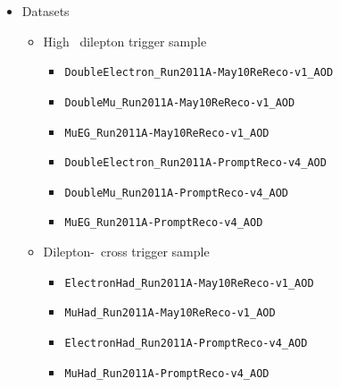 \begin{itemize}
   \item Datasets
   \begin{itemize}
      \item High \pt\ dilepton trigger sample
      \begin{itemize}
         \item \verb=DoubleElectron_Run2011A-May10ReReco-v1_AOD=
         \item \verb=DoubleMu_Run2011A-May10ReReco-v1_AOD=
         \item \verb=MuEG_Run2011A-May10ReReco-v1_AOD=
         \item \verb=DoubleElectron_Run2011A-PromptReco-v4_AOD=
         \item \verb=DoubleMu_Run2011A-PromptReco-v4_AOD=
         \item \verb=MuEG_Run2011A-PromptReco-v4_AOD=
      \end{itemize}
      \item Dilepton-\Ht\ cross trigger sample
      \begin{itemize}
         \item \verb=ElectronHad_Run2011A-May10ReReco-v1_AOD=
         \item \verb=MuHad_Run2011A-May10ReReco-v1_AOD=
         \item \verb=ElectronHad_Run2011A-PromptReco-v4_AOD=
         \item \verb=MuHad_Run2011A-PromptReco-v4_AOD=
      \end{itemize}
   \end{itemize}


\end{itemize}
